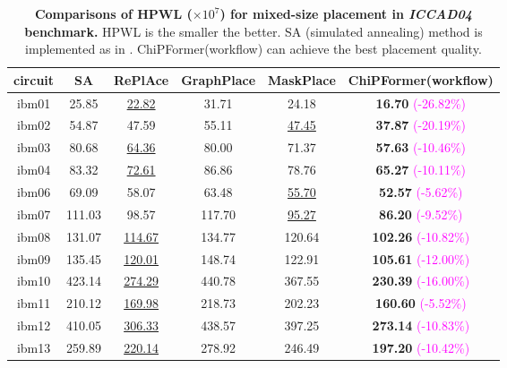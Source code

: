 \documentclass{article}
\theoremstyle{plain}
\theoremstyle{definition}
\theoremstyle{remark}
\begin{document}
\begin{table}[!htb]
	\caption{\textbf{Comparisons of HPWL ($\times10^7$) for \textbf{mixed-size} placement in \textit{ICCAD04} benchmark.} HPWL is the smaller the better. SA (simulated annealing) method is implemented as in \citet{mirhoseini2021graph}. ChiPFormer(workflow) can achieve the best placement quality.}
	\label{full-placement-iccad}
	\begin{center}
		\begin{adjustbox}{max width=\columnwidth}
			\begin{tabular}{cccccc}
				\toprule circuit & SA & RePlAce & GraphPlace & MaskPlace & ChiPFormer(workflow) \\
				\midrule
				ibm01  & 25.85 & \underline{22.82} & 31.71 & 24.18 & \textbf{16.70}  \textcolor{magenta}{\scriptsize{(-26.82\%)}}\\
				ibm02  & 54.87 & 47.59 & 55.11 & \underline{47.45} & \textbf{37.87} \textcolor{magenta}{\scriptsize{(-20.19\%)}}\\
				ibm03  & 80.68 & \underline{64.36} & 80.00 & 71.37 & \textbf{57.63} \textcolor{magenta}{\scriptsize{(-10.46\%)}}\\
				ibm04  & 83.32 & \underline{72.61} & 86.86 & 78.76 & \textbf{65.27} \textcolor{magenta}{\scriptsize{(-10.11\%)}}\\
				ibm06 & 69.09 & 58.07 & 63.48 & \underline{55.70} & \textbf{52.57} \textcolor{magenta}{\scriptsize{(-5.62\%)}}\\
				ibm07 & 111.03 & 98.57 & 117.70 & \underline{95.27} & \textbf{86.20} \textcolor{magenta}{\scriptsize{(-9.52\%)}}\\
				ibm08 & 131.07 & \underline{114.67} & 134.77 & 120.64 & \textbf{102.26} \textcolor{magenta}{\scriptsize{(-10.82\%)}}\\
				ibm09 & 135.45 & \underline{120.01} & 148.74 & 122.91 & \textbf{105.61} \textcolor{magenta}{\scriptsize{(-12.00\%)}}\\
				ibm10 & 423.14 & \underline{274.29} & 440.78 & 367.55 & \textbf{230.39} \textcolor{magenta}{\scriptsize{(-16.00\%)}}\\
				ibm11 & 210.12 &  \underline{169.98} & 218.73 & 202.23 & \textbf{160.60} \textcolor{magenta}{\scriptsize{(-5.52\%)}} \\
				ibm12 & 410.05 & \underline{306.33} & 438.57 & 397.25& \textbf{273.14} \textcolor{magenta}{\scriptsize{(-10.83\%)}} \\
				ibm13 & 259.89 & \underline{220.14} & 278.92 & 246.49 & \textbf{197.20} \textcolor{magenta}{\scriptsize{(-10.42\%)}}\\

\end{tabular}
\end{adjustbox}
\end{center}
\end{table}
\end{document}
